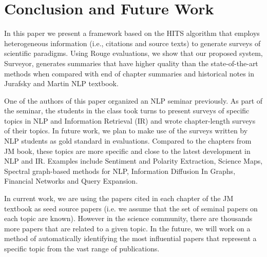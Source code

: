 \section{Conclusion and Future Work}
\label{sec:con}
In this paper we present a framework based on the HITS algorithm that employs heterogeneous information (i.e., citations and source texts) to generate surveys of scientific paradigms. Using Rouge evaluations, we show that our proposed system, Surveyor, generates summaries that have higher quality than the state-of-the-art methods when compared with end of chapter summaries and historical notes in Jurafsky and Martin NLP textbook.

One of the authors of this paper organized an NLP seminar previously. As part of the seminar, the students in the class took turns to present surveys of specific topics in NLP and Information Retrieval (IR) and wrote chapter-length surveys of their topics. 
In future work, we plan to make use of the surveys written by NLP students as
 gold standard in evaluations. Compared to the chapters from JM book, these topics are more 
specific and close to the latest development in NLP and IR. Examples include 
Sentiment and Polarity Extraction, 
Science Maps,
Spectral graph-based methods for NLP, 
Information Diffusion In Graphs,
Financial Networks and Query Expansion. 

In current work, we are using the papers cited in each chapter of the JM textbook
as seed source papers (i.e. we assume that the set of seminal papers on each topic are known).  However in the science community, there are  thousands more papers that are related to a given topic.  In the future,  we will work on a method of automatically identifying the most influential papers that represent a specific topic from the vast range of publications.
